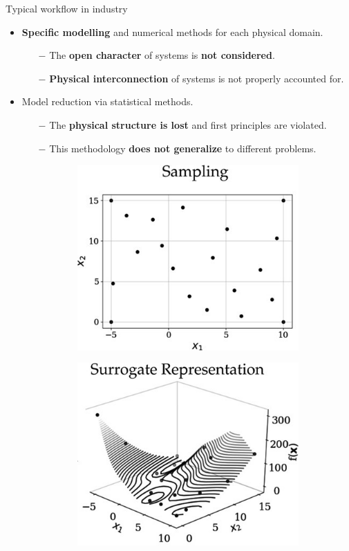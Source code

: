 \documentclass[aspectratio=169]{beamer}
\begin{document}
	\begin{frame}{Typical workflow in industry}
		
		\begin{itemize}
			\item \textbf{Specific modelling} and numerical methods for each physical domain. 
			\begin{itemize}
				\item[$-$] The \textbf{open character} of systems is \textbf{not considered}.
				\item[$-$] \textbf{Physical interconnection} of systems is not properly accounted for.
			\end{itemize}
			\item Model reduction via statistical methods.
			\begin{itemize}
				\item[$-$] The \textbf{physical structure is lost} and first principles are violated.
				\item[$-$] This methodology \textbf{does not generalize} to different problems.
			\end{itemize}
			\vspace{.3cm}
			\begin{figure}[t]
				\centering
				\begin{subfigure}[t]{0.4\textwidth}
					\includegraphics[width=.8\columnwidth]{sampling.jpg}
				\end{subfigure}\hspace{1cm}
				\begin{subfigure}[t]{0.4\textwidth}
					\includegraphics[width=.8\columnwidth]{surrogate_model.jpg}

\end{subfigure}
\end{figure}
\end{itemize}
\end{frame}
\end{document}
